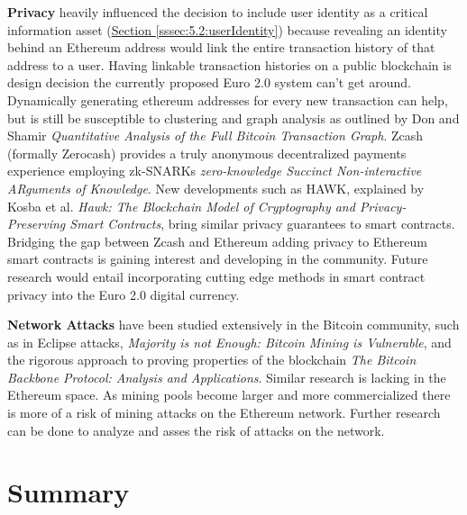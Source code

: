 \documentclass[a4paper,12pt]{article} %
\newcommand{\hypersectionref}[1]{\hyperref[#1]{Section \ref{#1}}}
\begin{document}
{\textbf{Privacy} heavily influenced the decision to include user identity as a critical information asset (\hypersectionref{sssec:5.2:userIdentity}) because revealing an identity behind an Ethereum address would link the entire transaction history of that address to a user. Having linkable transaction histories on a public blockchain is design decision the currently proposed Euro 2.0 system can't get around. Dynamically generating ethereum addresses for every new transaction can help, but is still be susceptible to clustering and graph analysis as outlined by Don and Shamir \textit{Quantitative Analysis of the Full Bitcoin Transaction Graph}\cite{Ron2013}. Zcash (formally Zerocash) provides a truly anonymous decentralized payments experience employing zk-SNARKs \textit{zero-knowledge Succinct Non-interactive ARguments of Knowledge}\cite{zerocash}. New developments such as HAWK, explained by Kosba et al. \textit{Hawk: The Blockchain Model of Cryptography and Privacy-Preserving Smart Contracts}\cite{hawk}, bring similar privacy guarantees to smart contracts. Bridging the gap between Zcash and Ethereum adding privacy to Ethereum smart contracts is gaining interest and developing in the community\cite{ZcashEtherumUpdate}\cite{zkSNARKsBlog}\cite{zkSNARKsPaper}. Future research would entail incorporating cutting edge methods in smart contract privacy into the Euro 2.0 digital currency.

\textbf{Network Attacks} have been studied extensively in the Bitcoin community, such as in Eclipse attacks\cite{EclipseAttacks}, \textit{Majority is not Enough: Bitcoin Mining is Vulnerable}\cite{MajorityIsNotEnough}, and the rigorous approach to proving properties of the blockchain \textit{The Bitcoin Backbone Protocol: Analysis and Applications}\cite{BitcoinBackboneProtocol}. Similar research is lacking in the Ethereum space. As mining pools become larger and more commercialized there is more of a risk of mining attacks on the Ethereum network. Further research can be done to analyze and asses the risk of attacks on the network.

\pagebreak

\section{Summary} \label{sec:6}

}
\end{document}
